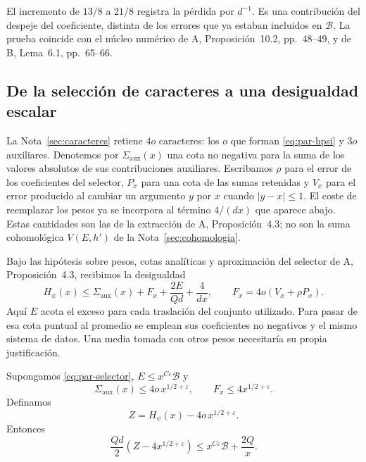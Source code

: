El incremento de $13/8$ a $21/8$ registra la pérdida por
$d^{-1}$. Es una contribución del despeje del coeficiente, distinta
de los errores que ya estaban incluidos en $\mathcal B$.
La prueba coincide con el núcleo numérico de A, Proposición~10.2,
pp.~48--49, y de B, Lema~6.1, pp.~65--66.

\subsection{De la selección de caracteres a una desigualdad escalar}

La Nota~\ref{sec:caracteres} retiene $4o$ caracteres: los $o$
que forman \eqref{eq:par-hpsi} y $3o$ auxiliares. Denotemos por
$\Sigma_{\mathrm{aux}}(x)$ una cota no negativa para la suma de
los valores absolutos de sus contribuciones auxiliares. Escribamos
$\rho$ para el error de los coeficientes del selector, $P_x$ para
una cota de las sumas retenidas y $V_x$ para el error producido al
cambiar un argumento $y$ por $x$ cuando $|y-x|\le1$.
El coste de reemplazar los pesos ya se incorpora al término
$4/(dx)$ que aparece abajo. Estas cantidades son las de la
extracción de A, Proposición~4.3; no son la suma cohomológica
$V(E,h')$ de la Nota~\ref{sec:cohomologia}.

Bajo las hipótesis sobre pesos, cotas analíticas y aproximación del
selector de A, Proposición~4.3, recibimos la desigualdad
\begin{equation}
 H_\psi(x)\le
 \Sigma_{\mathrm{aux}}(x)+F_x+
 \frac{2E}{Qd}+\frac{4}{dx},
 \qquad F_x=4o(V_x+\rho P_x).
 \label{eq:par-selector}
\end{equation}
Aquí $E$ acota el exceso para cada traslación del conjunto utilizado.
Para pasar de esa cota puntual al promedio se emplean sus coeficientes
no negativos y el mismo sistema de datos. Una media tomada con otros
pesos necesitaría su propia justificación.

\begin{lema}
\label{lem:par-selector}
Supongamos \eqref{eq:par-selector}, $E\le x^{C\varepsilon}\mathcal B$ y
\begin{equation}
 \Sigma_{\mathrm{aux}}(x)\le4o\,x^{1/2+\varepsilon},
 \qquad F_x\le4x^{1/2+\varepsilon}.
 \label{eq:par-auxiliares}
\end{equation}
Definamos
\begin{equation}
 Z=H_\psi(x)-4o\,x^{1/2+\varepsilon}.
 \label{eq:par-z}
\end{equation}
Entonces
\begin{equation}
 \frac{Qd}{2}\left(Z-4x^{1/2+\varepsilon}\right)
 \le x^{C\varepsilon}\mathcal B+\frac{2Q}{x}.
 \label{eq:par-escalar}
\end{equation}
\end{lema}

